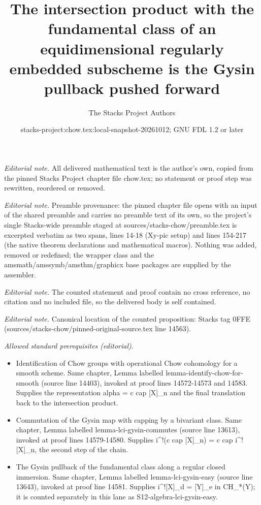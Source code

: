 \documentclass[10pt,a4paper]{amsart}
\title{The intersection product with the fundamental class of an equidimensional regularly embedded subscheme is the Gysin pullback pushed forward}
\author{The Stacks Project Authors}
\date{stacks-project:chow.tex:local-snapshot-20261012; GNU FDL 1.2 or later}
\theoremstyle{plain}
\theoremstyle{definition}
\theoremstyle{remark}
\numberwithin{equation}{subsection}
\begin{document}
\maketitle
\noindent\textit{Editorial note.} All delivered mathematical text is the author's own, copied from the pinned Stacks Project chapter file chow.tex; no statement or proof step was rewritten, reordered or removed.\par\medskip
\noindent\textit{Editorial note.} Preamble provenance: the pinned chapter file opens with an input of the shared preamble and carries no preamble text of its own, so the project's single Stacks-wide preamble staged at sources/stacks-chow/preamble.tex is excerpted verbatim as two spans, lines 14-18 (Xy-pic setup) and lines 154-217 (the native theorem declarations and mathematical macros). Nothing was added, removed or redefined; the wrapper class and the amsmath/amssymb/amsthm/graphicx base packages are supplied by the assembler.\par\medskip
\noindent\textit{Editorial note.} The counted statement and proof contain no cross reference, no citation and no included file, so the delivered body is self contained.\par\medskip
\noindent\textit{Editorial note.} Canonical location of the counted proposition: Stacks tag 0FFE (sources/stacks-chow/pinned-original-source.tex line 14563).\par\medskip
\noindent\textit{Allowed standard prerequisites (editorial).}\begin{itemize}
\item Identification of Chow groups with operational Chow cohomology for a smooth scheme. Same chapter, Lemma labelled lemma-identify-chow-for-smooth (source line 14403), invoked at proof lines 14572-14573 and 14583. Supplies the representation alpha = c cap [X]\_n and the final translation back to the intersection product.
\item Commutation of the Gysin map with capping by a bivariant class. Same chapter, Lemma labelled lemma-lci-gysin-commutes (source line 13613), invoked at proof lines 14579-14580. Supplies i\textasciicircum{}!(c cap [X]\_n) = c cap i\textasciicircum{}![X]\_n, the second step of the chain.
\item The Gysin pullback of the fundamental class along a regular closed immersion. Same chapter, Lemma labelled lemma-lci-gysin-easy (source line 13643), invoked at proof line 14581. Supplies i\textasciicircum{}![X]\_d = [Y]\_e in CH\_*(Y); it is counted separately in this lane as S12-algebra-lci-gysin-easy.
\end{itemize}\medskip
\end{document}
